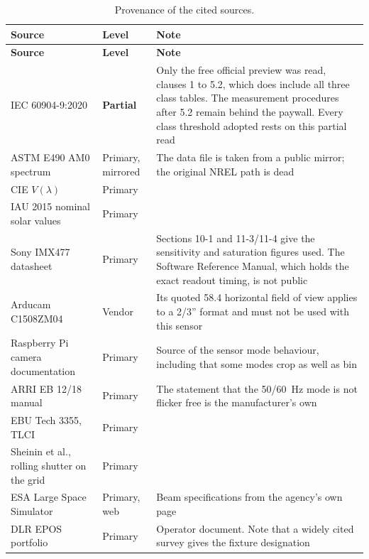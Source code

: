 \begin{longtable}{@{}p{} p{} p{}@{}}
\caption[Source provenance]{Provenance of the cited sources.}
\label{tab:sources} \\
\toprule
\textbf{Source} & \textbf{Level} & \textbf{Note} \\
\midrule
\endfirsthead
\toprule
\textbf{Source} & \textbf{Level} & \textbf{Note} \\
\midrule
\endhead
IEC 60904-9:2020 \cite{iec60904_9_2020} & \textbf{Partial} & Only the free
  official preview was read, clauses 1 to 5.2, which does include all three
  class tables. The measurement procedures after 5.2 remain behind the
  paywall. Every class threshold adopted rests on this partial read \\
ASTM E490 AM0 spectrum \cite{astm_e490_data} & Primary, mirrored & The data
  file is taken from a public mirror; the original NREL path is dead \\
CIE $V(\lambda)$ \cite{cie_vlambda} & Primary & \\
IAU 2015 nominal solar values \cite{prsa2016iau} & Primary & \\
Sony IMX477 datasheet \cite{sony_imx477_datasheet} & Primary & Sections 10-1
  and 11-3/11-4 give the sensitivity and saturation figures used. The
  Software Reference Manual, which holds the exact readout timing, is not
  public \\
Arducam C1508ZM04 \cite{arducam_c1508zm04} & Vendor & Its quoted
  58.4\textdegree{} horizontal field of view applies to a 2/3'' format and
  must not be used with this sensor \\
Raspberry Pi camera documentation \cite{raspberrypi_camera_docs} & Primary &
  Source of the sensor mode behaviour, including that some modes crop as
  well as bin \\
ARRI EB 12/18 manual \cite{arri_eb1218_manual} & Primary & The statement
  that the 50/60~Hz mode is not flicker free is the manufacturer's own \\
EBU Tech 3355, TLCI \cite{ebu_tech3355} & Primary & \\
Sheinin et al., rolling shutter on the grid \cite{sheinin2018rollingac} &
  Primary & \\
ESA Large Space Simulator \cite{esa_lss} & Primary, web & Beam
  specifications from the agency's own page \\
DLR EPOS portfolio \cite{dlr2025eposportfolio} & Primary & Operator
  document. Note that a widely cited survey gives the fixture designation

\end{longtable}
